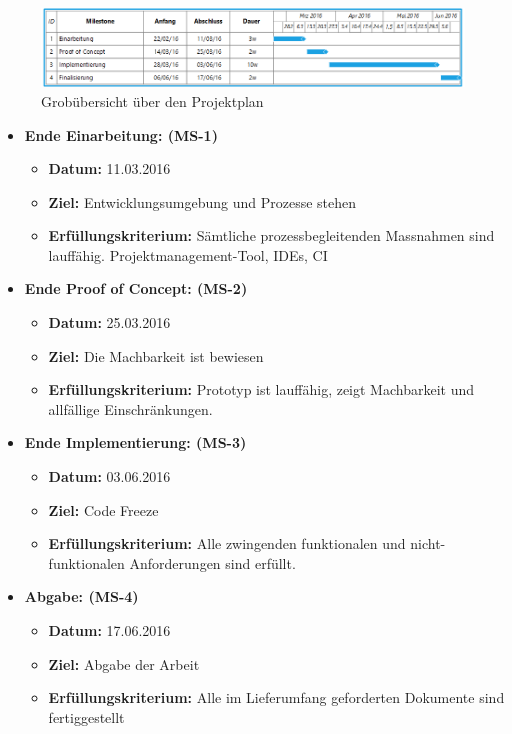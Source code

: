 \begin{figure}[ht]
	\centering
	\includegraphics[width=\textwidth]{images/projplan.png}
	\caption{Grobübersicht über den Projektplan}
	\label{Risk result}
\end{figure}

\begin{itemize}
	\item{\textbf{Ende Einarbeitung: (MS-1)} 
		\begin{itemize}
			\item{\textbf{Datum:} 11.03.2016}
			\item{\textbf{Ziel:} Entwicklungsumgebung und Prozesse stehen}
			\item{\textbf{Erfüllungskriterium:} Sämtliche prozessbegleitenden Massnahmen sind lauffähig. Projektmanagement-Tool, IDEs, CI}
		\end{itemize}
	}
	
	\item{\textbf{Ende Proof of Concept: (MS-2)} 
		\begin{itemize}
			\item{\textbf{Datum:} 25.03.2016}
			\item{\textbf{Ziel:} Die Machbarkeit ist bewiesen}
			\item{\textbf{Erfüllungskriterium:} Prototyp ist lauffähig, zeigt Machbarkeit und allfällige Einschränkungen.}
		\end{itemize}
	}
	
	\item{\textbf{Ende Implementierung: (MS-3)} 
		\begin{itemize}
			\item{\textbf{Datum:} 03.06.2016}
			\item{\textbf{Ziel:} Code Freeze}
			\item{\textbf{Erfüllungskriterium:} Alle zwingenden funktionalen und nicht-funktionalen Anforderungen sind erfüllt.}
		\end{itemize}
	}	
	\item{\textbf{Abgabe: (MS-4)} 
			\begin{itemize}
				\item{\textbf{Datum:} 17.06.2016}
				\item{\textbf{Ziel:} Abgabe der Arbeit}
				\item{\textbf{Erfüllungskriterium:} Alle im Lieferumfang geforderten Dokumente sind fertiggestellt}
			\end{itemize}
	}
	
\end{itemize}


